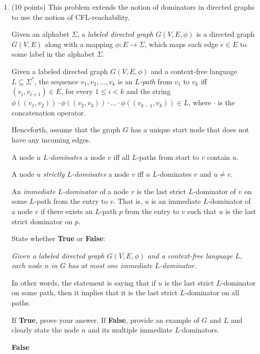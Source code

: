 \documentclass[12pt]{article}
\begin{document}
\begin{enumerate}
\begin{mdframed}
\begin{tikzpicture}[
          every node/.style={circle, draw, minimum size=1cm},
          ->,
          node distance=2cm and 1.5cm
        ]
      \end{tikzpicture}
        
      \end{mdframed}

      \clearpage
      \item (10 points) This problem extends the notion of dominators in
      directed graphs to use the notion of CFL-reachability.

      Given an alphabet $\Sigma$, a \emph{labeled directed graph} $G(V, E, \phi)$ is a
      directed graph $G(V, E)$  along with a mapping $\phi \colon E \to \Sigma$,
      which maps each edge $e\in E$ to some label in the alphabet $\Sigma$. 

      Given a labeled directed graph $G(V, E, \phi)$ and a context-free language
      $L \subseteq \Sigma^*$, the sequence $v_1, v_2, \ldots, v_k$ is an
      \emph{$L$-path} from $v_1$ to $v_k$ iff $(v_i,v_{i+1}) \in E$, for every
      $1\leq i < k$ and the string $\phi((v_1, v_2)) \cdot \phi((v_2, v_3)) \cdot \ldots \cdot
      \phi((v_{k-1},v_k)) \in L$, where $\cdot$ is the concatenation operator. 

      Henceforth, assume that the graph $G$ has a unique start node that does
      not have any incoming edges. 

      A node $u$ \emph{$L$-dominates} a node $v$ iff all $L$-paths from start to 
      $v$ contain $u$. 

      A node $u$ \emph{strictly $L$-dominates} a node $v$ iff $u$ $L$-dominates $v$ 
      and $u \neq v$. 

      An \emph{immediate $L$-dominator} of a node $v$ is the last strict
      $L$-dominator of $v$ on some $L$-path from the entry to $v$. That is, $u$
      is an immediate $L$-dominator of a node $v$ if there exists an $L$-path
      $p$ from the entry to $v$ such that $u$ is the last strict dominator on
      $p$.

      State whether \textbf{True} or \textbf{False}: 
    
      \emph{Given a labeled directed graph $G(V,E, \phi)$ and a context-free
      language $L$, each node $n$ in $G$ has at most one immediate $L$-dominator.}

      In other words, the statement is saying that if $u$ is the last strict
      $L$-dominator on some path, then it implies that it is the last strict
      $L$-dominator on all paths. 
    
      If \textbf{True}, prove your answer. If \textbf{False}, provide an example
      of $G$ and $L$ and clearly state the node $n$ and its multiple immediate
      $L$-dominators.
      \begin{mdframed}
      \textbf{False} %


\end{mdframed}
\end{enumerate}
\end{document}
